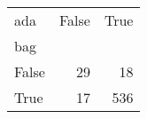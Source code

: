 \begin{tabular}{lrr}
\toprule
ada &  False &  True  \\
bag   &        &        \\
\midrule
False &     29 &     18 \\
True  &     17 &    536 \\
\bottomrule
\end{tabular}
